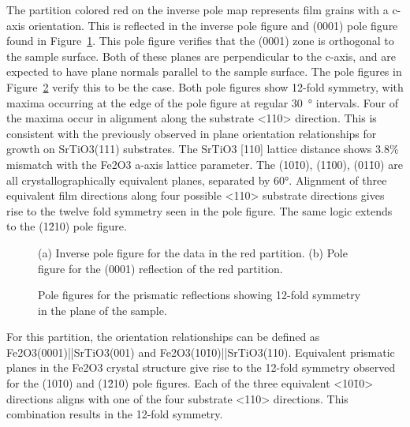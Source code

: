 \documentclass[12pt,%
              twoside,
               letterpaper]{uiothesis}
\begin{document}
The partition colored red on the inverse pole map represents film grains with a c-axis
orientation. This is reflected in the inverse pole figure and (0001) pole figure found in
Figure~\ref{fig:red0001}. This pole figure verifies that the (0001) zone is orthogonal to the
sample surface. 
Both of these planes are perpendicular to the c-axis, and are expected to have plane
normals parallel to the sample surface. The pole figures in Figure~\ref{fig:redinplanepole}
verify this to be the case. Both pole figures show 12-fold symmetry, with maxima occurring
at the edge of the pole figure at regular \SI{30}{\degree} intervals. Four of the maxima
occur in alignment along the substrate <110> direction. This is consistent with the
previously observed in plane orientation relationships for growth on SrTiO3(111)
substrates. The SrTiO3 [110] lattice distance shows 3.8\% mismatch with the
Fe2O3 a-axis lattice parameter. The (10\={1}0), (1\={1}00),  (01\={1}0) are all
crystallographically equivalent planes, separated by 60\si{\degree}. Alignment of three
equivalent film directions along four possible <110> substrate directions gives rise to
the twelve fold symmetry seen in the pole figure. The same logic extends to the (1\={2}10)
pole figure.
\begin{figure}
	\centering
	\caption[Orientation analysis for red partition]{%
		(a) Inverse pole figure for the data in the red partition. (b) Pole 
		figure for the (0001) reflection of the red partition.}
	\label{fig:red0001}
\end{figure}
\begin{figure}
	\centering
	\caption[Pole figures for prismatic reflections]{%
		Pole figures for the prismatic reflections showing 12-fold 
		symmetry in the plane of the sample.}
	\label{fig:redinplanepole}
\end{figure}
For this partition, the orientation relationships can be defined as
Fe2O3(0001)||SrTiO3(001) and Fe2O3(10\={1}0)||SrTiO3(110). Equivalent
prismatic planes in the Fe2O3 crystal structure give rise to the 12-fold symmetry
observed for the (10\={1}0) and (1\={2}10) pole figures. Each of the three equivalent
<10\={1}0> directions aligns with one of the four substrate <110> directions. This
combination results in the 12-fold symmetry.
\end{document}
